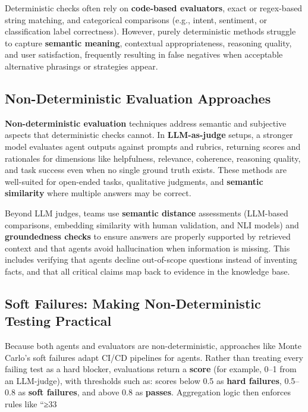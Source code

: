 \begin{TNtwocol}
Deterministic checks often rely on \textbf{code-based evaluators}, exact or regex-based string matching, and categorical comparisons (e.g., intent, sentiment, or classification label correctness). However, purely deterministic methods struggle to capture \textbf{semantic meaning}, contextual appropriateness, reasoning quality, and user satisfaction, frequently resulting in false negatives when acceptable alternative phrasings or strategies appear.

\subsection*{Non-Deterministic Evaluation Approaches}

\textbf{Non-deterministic evaluation} techniques address semantic and subjective aspects that deterministic checks cannot. In \textbf{LLM-as-judge} setups, a stronger model evaluates agent outputs against prompts and rubrics, returning scores and rationales for dimensions like helpfulness, relevance, coherence, reasoning quality, and task success even when no single ground truth exists. These methods are well-suited for open-ended tasks, qualitative judgments, and \textbf{semantic similarity} where multiple answers may be correct.

Beyond LLM judges, teams use \textbf{semantic distance} assessments (LLM-based comparisons, embedding similarity with human validation, and NLI models) and \textbf{groundedness checks} to ensure answers are properly supported by retrieved context and that agents avoid hallucination when information is missing. This includes verifying that agents decline out-of-scope questions instead of inventing facts, and that all critical claims map back to evidence in the knowledge base.

\subsection*{Soft Failures: Making Non-Deterministic Testing Practical}

Because both agents and evaluators are non-deterministic, approaches like Monte Carlo's soft failures adapt CI/CD pipelines for agents. Rather than treating every failing test as a hard blocker, evaluations return a \textbf{score} (for example, 0–1 from an LLM-judge), with thresholds such as: scores below 0.5 as \textbf{hard failures}, 0.5–0.8 as \textbf{soft failures}, and above 0.8 as \textbf{passes}. Aggregation logic then enforces rules like “≥33%


\end{TNtwocol}
